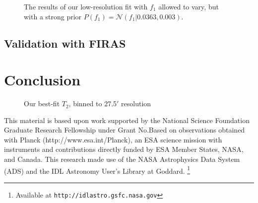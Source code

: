 \documentclass{emulateapj}
\begin{document}
\begin{figure}
\begin{center}
\caption{\label{fig:f1} The results of our low-resolution fit with $f_1$
allowed to vary, but with a strong prior 
$P(f_1)=\mathcal{N}(f_1|0.0363, 0.003)$.}
\end{center}
\end{figure}

\subsection{Validation with FIRAS}

\section{Conclusion}


\label{sec:conclusion}

\begin{figure*} [ht]
\begin{center}
\caption{Our best-fit $T_2$, binned to 27.5$'$ resolution}
\end{center}
\end{figure*}

This material is based upon work supported by the National Science Foundation 
Graduate Research Fellowship under Grant No.Based on observations obtained with
 Planck (http://www.esa.int/Planck), an ESA science mission with instruments 
and contributions directly funded by ESA Member States, NASA, and Canada. This 
research made use of the NASA Astrophysics Data System (ADS) and the IDL 
Astronomy User's Library at Goddard. \footnote{Available at 
\texttt{http://idlastro.gsfc.nasa.gov}}



\end{document}

